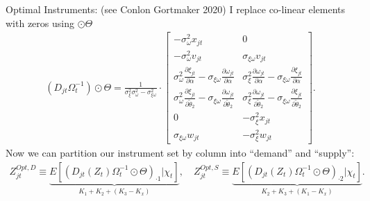 \documentclass[aspectratio=169,11pt]{beamer}
\begin{document}
\begin{frame}{Optimal Instruments: (see Conlon Gortmaker 2020) }
\noindent I replace co-linear elements with zeros using $\odot \Theta$
\begin{align*}
    (D_{jt} \Omega_t^{-1} ) \odot \Theta =  \frac{1}{\sigma_\xi^2 \sigma_\omega^2 - \sigma_{\xi \omega}^2} \cdot 
    \begin{bmatrix}
        -\sigma_\omega^2 x_{jt} & 0  \\
        -\sigma_\omega^2 v_{jt} & \sigma_{\xi \omega} v_{jt} \\
        \sigma_\omega^2 \frac{\partial \xi_{jt}}{\partial \alpha} - 
        \sigma_{\xi\omega}\frac{\partial \omega_{jt}}{\partial \alpha} 
        & \sigma_{\xi}^2 \frac{\partial \omega_{jt}}{\partial \alpha}  - 
        \sigma_{\xi\omega}\frac{\partial \xi_{jt}}{\partial \alpha}  \\
        \sigma_\omega^2 \frac{\partial \xi_{jt}}{\partial \widetilde{\theta}_2}  -
        \sigma_{\xi\omega}\frac{\partial \omega_{jt}}{\partial \widetilde{\theta}_2} 
        & \sigma_{\xi}^2 \frac{\partial \omega_{jt}}{\partial \widetilde{\theta}_2} - 
        \sigma_{\xi\omega}\frac{\partial \xi_{jt}}{\partial \widetilde{\theta}_2}\\
        0 &  -\sigma_{\xi}^2 x_{jt} \\
        \sigma_{\xi\omega} w_{jt} & -\sigma_{\xi}^2 w_{jt}
    \end{bmatrix}
    .
\end{align*}
\noindent Now we can partition our instrument set by column into ``demand'' and ``supply'': 
\begin{align*}
    Z_{jt}^{\textit{Opt},D} \equiv \underbrace{E[(D_{jt}(Z_t) \Omega_t^{-1} \odot \Theta)_{\cdot 1} | \chi_t]}_{K_1 + K_2 + (K_3 - K_x)}, \quad Z_{jt}^{\textit{Opt},S} \equiv \underbrace{E[(D_{jt}(Z_t)\Omega_t^{-1} \odot \Theta)_{\cdot 2} | \chi_t]}_{K_2 + K_3+ (K_1 - K_x)}.
\end{align*}
\end{frame}
\end{document}
